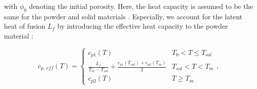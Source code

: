\documentclass [11pt, proquest] {uwthesis}[2020/02/24]
\begin{document}
\noindent with $\phi_{0}$ denoting the initial porosity. Here, the
heat capacity is assumed to be the same for the powder and solid materials
\cite{karayagiz2019numerical}. Especially, we account for the latent
heat of fusion $L_{f}$ by introducing the effective heat capacity
to the powder material \cite{Yadroitsev2009}:

\begin{equation}
c_{p,\,eff}(T)=\begin{cases}
c_{p1}(T) & T_{0}<T\leq T_{sol}\\
\frac{L_{f}}{T_{m}-T_{sol}}+\frac{c_{p1}(T_{sol})+c_{p2}(T_{m})}{2} & T_{sol}<T<T_{m}\\
c_{p2}(T) & T\geq T_{m}
\end{cases},\label{eq:effective_heat_cap}
\end{equation}
\end{document}
